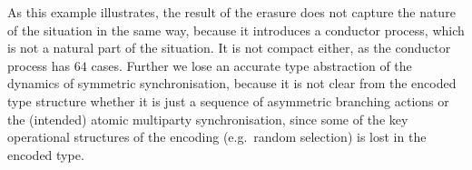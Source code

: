 As this example illustrates, the result of the erasure does not
capture the nature of the situation in the same way, because it introduces
a conductor process, which is not a natural part of the situation.  It
is not compact either, as the conductor process has $64$ cases. Further we
lose an accurate type abstraction of the dynamics of symmetric
synchronisation, because it is not clear from the encoded type structure
whether it is just a sequence of asymmetric branching actions or
the (intended) atomic multiparty synchronisation, since some of the
key operational structures of the encoding (e.g.~random selection) is
lost in the encoded type.
